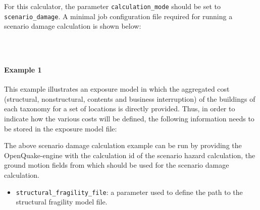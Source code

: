 For this calculator, the parameter \Verb+calculation_mode+ should be set to
\Verb+scenario_damage+. A minimal job configuration file required for
running a scenario damage calculation is shown below:

\inputminted[firstline=1,firstnumber=1,fontsize=\footnotesize,frame=single,linenos,bgcolor=lightgray]{ini}{oqum/risk/Verbatim/config_scenario_damage_minimal.ini}\\

\paragraph{Example 1}

This example illustrates an \gls{exposure model} in which the aggregated
cost (structural, nonstructural, contents and business interruption) of the
buildings of each taxonomy for a set of locations is directly provided. Thus,
in order to indicate how the various costs will be defined, the following
information needs to be stored in the exposure model file:

The above scenario damage calculation example can be run by providing the
OpenQuake-engine with the calculation id of the scenario hazard calculation,
the ground motion fields from which should be used for the scenario damage
calculation.

\begin{itemize}
	\item \Verb+structural_fragility_file+: a parameter used to define the path
	to the structural \gls{fragility model} file.
\end{itemize}